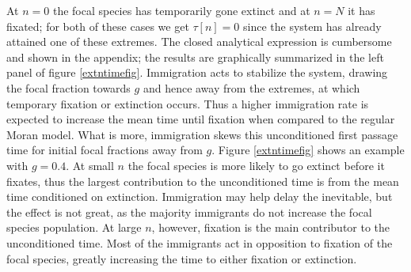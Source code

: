 At $n=0$ the focal species has temporarily gone extinct and at $n=N$ it has fixated; for both of these cases we get $\tau[n]=0$ since the system has already attained one of these extremes. %
The closed analytical expression is cumbersome and shown in the appendix; the results are graphically summarized in the left panel of figure \ref{extntimefig}. 
Immigration acts to stabilize the system, drawing the focal fraction towards $g$ and hence away from the extremes, at which temporary fixation or extinction occurs. 
Thus a higher immigration rate is expected to increase the mean time until fixation when compared to the regular Moran model. 
What is more, immigration skews this unconditioned first passage time for initial focal fractions away from $g$. 
Figure \ref{extntimefig} shows an example with $g=0.4$. 
At small $n$ the focal species is more likely to go extinct before it fixates, thus the largest contribution to the unconditioned time is from the mean time conditioned on extinction. Immigration may help delay the inevitable, but the effect is not great, as the majority immigrants do not increase the focal species population. %
At large $n$, however, fixation is the main contributor to the unconditioned time. Most of the immigrants act in opposition to fixation of the focal species, greatly increasing the time to either fixation or extinction. 
